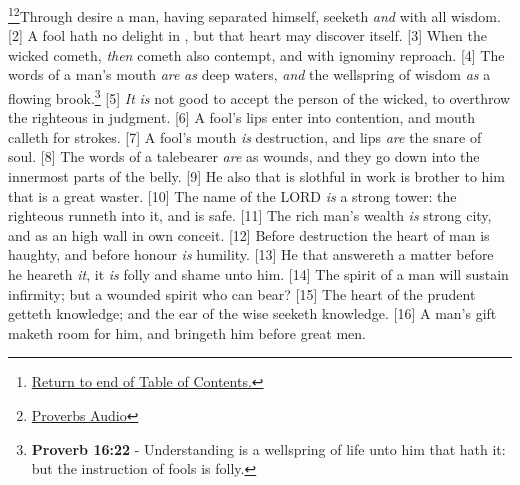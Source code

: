 \footnote{\textcolor[cmyk]{0.99998,1,0,0}{\hyperlink{TOC}{Return to end of Table of Contents.}}}\footnote{\href{https://www.audioverse.org/english/audiobibles/books/ENGKJV/O/Prov/1}{\textcolor[cmyk]{0.99998,1,0,0}{Proverbs Audio}}}\textcolor[cmyk]{0.99998,1,0,0}{Through desire a man, having separated himself, seeketh \emph{and}  with all wisdom.}
[2] \textcolor[cmyk]{0.99998,1,0,0}{A fool hath no delight in , but that  heart may discover itself.}
[3] \textcolor[cmyk]{0.99998,1,0,0}{When the wicked cometh, \emph{then} cometh also contempt, and with ignominy reproach.}
[4] \textcolor[cmyk]{0.99998,1,0,0}{The words of a man's mouth \emph{are} \emph{as} deep waters, \emph{and} the wellspring of wisdom \emph{as} a flowing brook.}\footnote{\textbf{Proverb 16:22} - Understanding is a wellspring of life unto him that hath it: but the instruction of fools is folly.}
[5] \textcolor[cmyk]{0.99998,1,0,0}{\emph{It} \emph{is} not good to accept the person of the wicked, to overthrow the righteous in judgment.}
[6] \textcolor[cmyk]{0.99998,1,0,0}{A fool's lips enter into contention, and  mouth calleth for strokes.}
[7] \textcolor[cmyk]{0.99998,1,0,0}{A fool's mouth \emph{is}  destruction, and  lips \emph{are} the snare of  soul.}
[8] \textcolor[cmyk]{0.99998,1,0,0}{The words of a talebearer \emph{are} as wounds, and they go down into the innermost parts of the belly.}
[9] \textcolor[cmyk]{0.99998,1,0,0}{He also that is slothful in  work is brother to him that is a great waster.}
[10] \textcolor[cmyk]{0.99998,1,0,0}{The name of the LORD \emph{is} a strong tower: the righteous runneth into it, and is safe.}
[11] \textcolor[cmyk]{0.99998,1,0,0}{The rich man's wealth \emph{is}  strong city, and as an high wall in  own conceit.}
[12] \textcolor[cmyk]{0.99998,1,0,0}{Before destruction the heart of man is haughty, and before honour \emph{is} humility.}
[13] \textcolor[cmyk]{0.99998,1,0,0}{He that answereth a matter before he heareth \emph{it}, it \emph{is} folly and shame unto him.}
[14] \textcolor[cmyk]{0.99998,1,0,0}{The spirit of a man will sustain  infirmity; but a wounded spirit who can bear?}
[15] \textcolor[cmyk]{0.99998,1,0,0}{The heart of the prudent getteth knowledge; and the ear of the wise seeketh knowledge.}
[16] \textcolor[cmyk]{0.99998,1,0,0}{A man's gift maketh room for him, and bringeth him before great men.}
